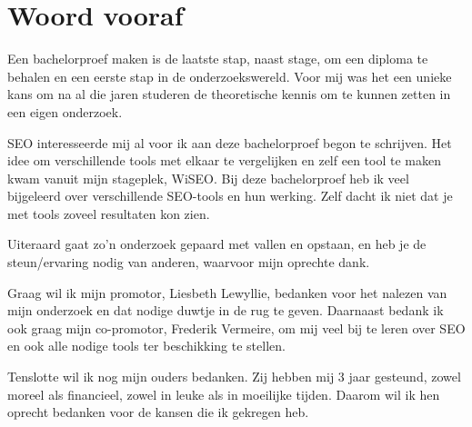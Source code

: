 
\chapter*{Woord vooraf}
\label{ch:voorwoord}

Een bachelorproef maken is de laatste stap, naast stage, om een diploma te behalen en een eerste stap in de onderzoekswereld. Voor mij was het een unieke kans om na al die jaren studeren de theoretische kennis om te kunnen zetten in een eigen onderzoek.

SEO interesseerde mij al voor ik aan deze bachelorproef begon te schrijven. Het idee om verschillende tools met elkaar te vergelijken en zelf een tool te maken kwam vanuit mijn stageplek, WiSEO. Bij deze bachelorproef heb ik veel bijgeleerd over verschillende SEO-tools en hun werking. Zelf dacht ik niet dat je met tools zoveel resultaten kon zien. 

Uiteraard gaat zo'n onderzoek gepaard met vallen en opstaan, en heb je de steun/ervaring nodig van anderen, waarvoor mijn oprechte dank. 

Graag wil ik mijn promotor, Liesbeth Lewyllie, bedanken voor het nalezen van mijn onderzoek en dat nodige duwtje in de rug te geven. Daarnaast bedank ik ook graag mijn co-promotor, Frederik Vermeire, om mij veel bij te leren over SEO en ook alle nodige tools ter beschikking te stellen. 

Tenslotte wil ik nog mijn ouders bedanken. Zij hebben mij 3 jaar gesteund, zowel moreel als financieel, zowel in leuke als in moeilijke tijden. Daarom wil ik hen oprecht bedanken voor de kansen die ik gekregen heb. 